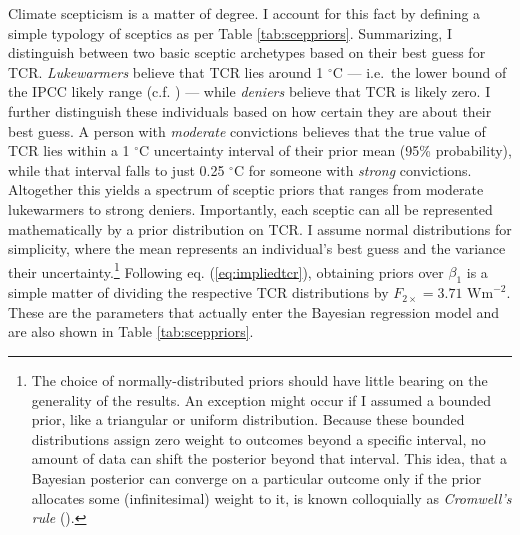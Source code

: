 \documentclass[smallextended]{svjour3}       %
\begin{document}
Climate scepticism is a matter of degree. I account for this fact by
defining a simple typology of sceptics as per Table
\ref{tab:sceppriors}. Summarizing, I distinguish between two basic
sceptic archetypes based on their best guess for TCR.
\textit{Lukewarmers} believe that TCR lies around 1 \(^\circ\)C ---
i.e.~the lower bound of the IPCC likely range (c.f.
\cite{ridley2015lukewarmer}) --- while \textit{deniers} believe that TCR
is likely zero. I further distinguish these individuals based on how
certain they are about their best guess. A person with \textit{moderate}
convictions believes that the true value of TCR lies within a 1
\(^\circ\)C uncertainty interval of their prior mean (95\% probability),
while that interval falls to just 0.25 \(^\circ\)C for someone with
\textit{strong} convictions. Altogether this yields a spectrum of
sceptic priors that ranges from moderate lukewarmers to strong deniers.
Importantly, each sceptic can all be represented mathematically by a
prior distribution on TCR. I assume normal distributions for simplicity,
where the mean represents an individual's best guess and the variance
their uncertainty.\footnote{The choice of normally-distributed priors
  should have little bearing on the generality of the results. An
  exception might occur if I assumed a bounded prior, like a triangular
  or uniform distribution. Because these bounded distributions assign
  zero weight to outcomes beyond a specific interval, no amount of data
  can shift the posterior beyond that interval. This idea, that a
  Bayesian posterior can converge on a particular outcome only if the
  prior allocates some (infinitesimal) weight to it, is known
  colloquially as \emph{Cromwell's rule} (\cite{jackman2009bayesian}).}
Following eq. (\ref{eq:impliedtcr}), obtaining priors over \(\beta_1\)
is a simple matter of dividing the respective TCR distributions by
\(F_{2\times}=3.71\text{ Wm}^{-2}\). These are the parameters that
actually enter the Bayesian regression model and are also shown in Table
\ref{tab:sceppriors}.
\end{document}

